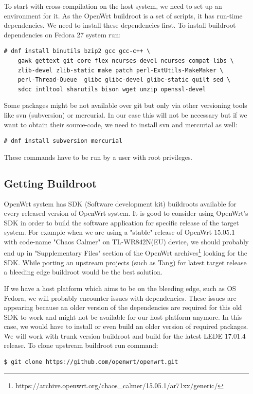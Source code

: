 To start with cross-compilation on the host system, we need to set up an environment for it.
As the OpenWrt buildroot is a set of scripts, it has run-time dependencies.
We need to install these dependencies first.
To install buildroot dependencies on Fedora 27 system run:
\begin{lstlisting}[columns=fixed,basicstyle=\ttfamily\footnotesize,tabsize=4,backgroundcolor=\color{yellow!10}]
# dnf install binutils bzip2 gcc gcc-c++ \
    gawk gettext git-core flex ncurses-devel ncurses-compat-libs \
    zlib-devel zlib-static make patch perl-ExtUtils-MakeMaker \
    perl-Thread-Queue  glibc glibc-devel glibc-static quilt sed \
    sdcc intltool sharutils bison wget unzip openssl-devel
\end{lstlisting}
Some packages might be not available over git but only via other versioning tools like svn (subversion) or mercurial.
In our case this will not be necessary but if we want to obtain their source-code, we need to install svn and mercurial as well:
\begin{lstlisting}[columns=fixed,basicstyle=\ttfamily\footnotesize,tabsize=4,backgroundcolor=\color{yellow!10}]
# dnf install subversion mercurial
\end{lstlisting}
These commands have to be run by a user with root privileges.



\subsection{Getting Buildroot}

OpenWrt system has SDK (Software development kit) buildroots available for every released version of OpenWrt system.
It is good to consider using OpenWrt's SDK in order to build the software application for specific release of the target system.
For example when we are using a "stable" release of OpenWrt 15.05.1 with code-name "Chaos Calmer" on TL-WR842N(EU) device, we should probably end up in "Supplementary Files" section of the OpenWrt archives\footnote{https://archive.openwrt.org/chaos\_calmer/15.05.1/ar71xx/generic/} looking for the SDK.
While porting an upstream projects (such as Tang) for latest target release a bleeding edge buildroot would be the best solution.

If we have a host platform which aims to be on the bleeding edge, such as OS Fedora, we will probably encounter issues with dependencies.
These issues are appearing because an older version of the dependencies are required for this old SDK to work and might not be available for our host platform anymore.
In this case, we would have to install or even build an older version of required packages.
We will work with trunk version buildroot and build for the latest LEDE 17.01.4 release.
To clone upstream buildroot run command:
\begin{lstlisting}[columns=fixed,basicstyle=\ttfamily\footnotesize,tabsize=4,backgroundcolor=\color{yellow!10}]
$ git clone https://github.com/openwrt/openwrt.git
\end{lstlisting}

